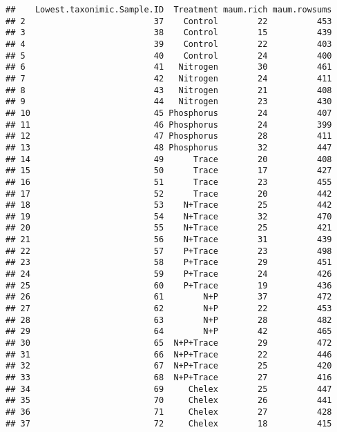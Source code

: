 \documentclass[]{article}
\begin{document}
\begin{verbatim}
##    Lowest.taxonimic.Sample.ID  Treatment maum.rich maum.rowsums
## 2                          37    Control        22          453
## 3                          38    Control        15          439
## 4                          39    Control        22          403
## 5                          40    Control        24          400
## 6                          41   Nitrogen        30          461
## 7                          42   Nitrogen        24          411
## 8                          43   Nitrogen        21          408
## 9                          44   Nitrogen        23          430
## 10                         45 Phosphorus        24          407
## 11                         46 Phosphorus        24          399
## 12                         47 Phosphorus        28          411
## 13                         48 Phosphorus        32          447
## 14                         49      Trace        20          408
## 15                         50      Trace        17          427
## 16                         51      Trace        23          455
## 17                         52      Trace        20          442
## 18                         53    N+Trace        25          442
## 19                         54    N+Trace        32          470
## 20                         55    N+Trace        25          421
## 21                         56    N+Trace        31          439
## 22                         57    P+Trace        23          498
## 23                         58    P+Trace        29          451
## 24                         59    P+Trace        24          426
## 25                         60    P+Trace        19          436
## 26                         61        N+P        37          472
## 27                         62        N+P        22          453
## 28                         63        N+P        28          482
## 29                         64        N+P        42          465
## 30                         65  N+P+Trace        29          472
## 31                         66  N+P+Trace        22          446
## 32                         67  N+P+Trace        25          420
## 33                         68  N+P+Trace        27          416
## 34                         69     Chelex        25          447
## 35                         70     Chelex        26          441
## 36                         71     Chelex        27          428
## 37                         72     Chelex        18          415
\end{verbatim}
\end{document}
